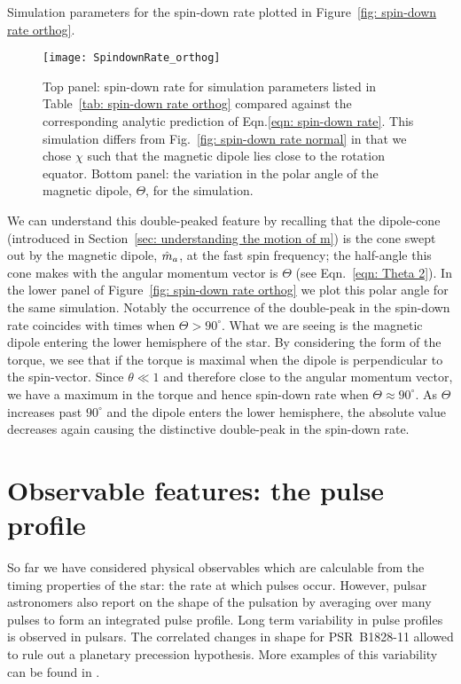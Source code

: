 \documentclass[../full_thesis/full_thesis.tex]{subfiles}
\newcommand{\thisdir}{../inertial_frame}
\begin{document}
\begin{table}[htb]
\centering

\caption{Simulation parameters for the spin-down rate plotted in Figure~\ref{fig:
spin-down rate orthog}.}
\label{tab: spin-down rate orthog}
\end{table}

\begin{figure}[htb]
\centering
\texttt{[image: SpindownRate\_orthog]}
\caption{Top panel: spin-down rate for simulation parameters listed in Table~\ref{tab:
spin-down rate orthog} compared against the corresponding analytic prediction
of Eqn.\eqref{eqn: spin-down rate}. This simulation differs from
Fig.~\ref{fig: spin-down rate normal} in that we chose $\chi$ such that the
magnetic dipole lies close to the rotation equator. Bottom panel: the variation
in the polar angle of the magnetic dipole, $\Theta$, for the simulation.}
\label{fig: spin-down rate orthog}
\end{figure}

We can understand this double-peaked feature by recalling that the dipole-cone
(introduced in Section~\ref{sec: understanding the motion of m}) is the
cone swept out by the magnetic dipole, $\hat{m}_a$, at the fast spin frequency; the
half-angle this cone makes with the angular momentum vector is $\Theta$ (see
Eqn.~\eqref{eqn: Theta 2}).  In the lower panel of Figure~\ref{fig: spin-down
rate orthog} we plot this polar angle for the same simulation. Notably the
occurrence of the double-peak in the spin-down rate coincides with times when
$\Theta > 90^{\circ}$. What we are seeing is the magnetic dipole entering the
lower hemisphere of the star. By considering the form of the
\citet{Deutsch1955} torque, we see that if the torque is maximal when the
dipole is perpendicular to the spin-vector. Since $\theta \ll 1$ and therefore
close to the angular momentum vector, we have a maximum in the torque and hence
spin-down rate when $\Theta \approx 90^{\circ}$. As $\Theta$ increases past
$90^{\circ}$ and the dipole enters the lower hemisphere, the absolute value
decreases again causing the distinctive double-peak in the spin-down rate.


\section{Observable features: the pulse profile}
\label{sec: observable features: shape}

So far we have considered physical observables which are calculable from the
timing properties of the star: the rate at which pulses occur. However, pulsar
astronomers also report on the shape of the pulsation by averaging over many
pulses to form an integrated pulse profile.  Long term variability in pulse
profiles is observed in pulsars. The correlated changes in shape for
PSR~B1828-11 allowed \citet{Stairs2000} to rule out a planetary precession
hypothesis. More examples of this variability can be found in \citet{Lyne2010}.
\end{document}
